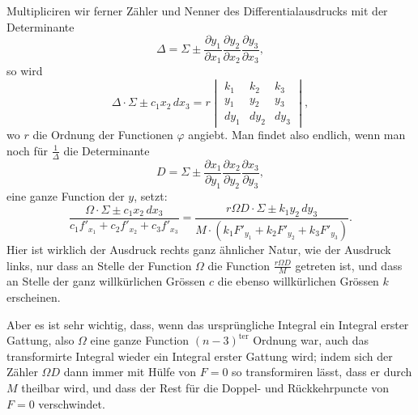 \documentclass[10pt]{article}
\begin{document}
Multipliciren wir ferner Zähler und Nenner des Differentialausdrucks mit der Determinante
\[
\Delta=\Sigma\pm
\frac{\partial y_1}{\partial x_1}
\frac{\partial y_2}{\partial x_2}
\frac{\partial y_3}{\partial x_3},
\]
so wird
\[
\Delta\cdot\Sigma\pm c_1x_2\,dx_3
=r\begin{vmatrix}
k_1&k_2&k_3\\
y_1&y_2&y_3\\
dy_1&dy_2&dy_3
\end{vmatrix},
\]
wo \(r\) die Ordnung der Functionen \(\varphi\) angiebt. Man findet also endlich, wenn man noch für \(\frac1\Delta\) die Determinante
\[
D=\Sigma\pm
\frac{\partial x_1}{\partial y_1}
\frac{\partial x_2}{\partial y_2}
\frac{\partial x_3}{\partial y_3},
\]
eine ganze Function der \(y\), setzt:
\[
\frac{\Omega\cdot\Sigma\pm c_1x_2\,dx_3}
 {c_1f'_{x_1}+c_2f'_{x_2}+c_3f'_{x_3}}
=
\frac{r\Omega D\cdot\Sigma\pm k_1y_2\,dy_3}
 {M\cdot (k_1F'_{y_1}+k_2F'_{y_2}+k_3F'_{y_3})}.
\]
Hier ist wirklich der Ausdruck rechts ganz ähnlicher Natur, wie der Ausdruck links, nur dass an Stelle der Function \(\Omega\) die Function \(\frac{r\Omega D}{M}\) getreten ist, und dass an Stelle der ganz willkürlichen Grössen \(c\) die ebenso willkürlichen Grössen \(k\) erscheinen.

Aber es ist sehr wichtig, dass, wenn das ursprüngliche Integral ein Integral erster Gattung, also \(\Omega\) eine ganze Function \((n-3)^{\text{ter}}\) Ordnung war, auch das transformirte Integral wieder ein Integral erster Gattung wird; indem sich der Zähler \(\Omega D\) dann immer mit Hülfe von \(F=0\) so transformiren lässt, dass er durch \(M\) theilbar wird, und dass der Rest für die Doppel- und Rückkehrpuncte von \(F=0\) verschwindet.
\end{document}
